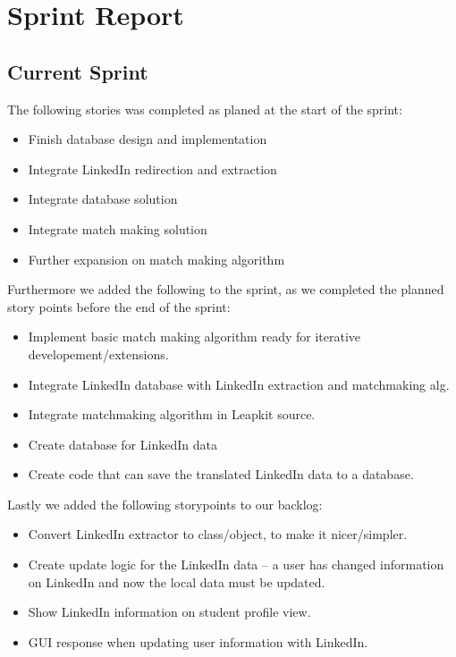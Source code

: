 \section{Sprint Report}

\subsection{Current Sprint}

The following stories was completed as planed at the start of the sprint:
\begin{itemize}
    \item Finish database design and implementation
    \item Integrate LinkedIn redirection and extraction
    \item Integrate database solution
    \item Integrate match making solution
    \item Further expansion on match making algorithm
\end{itemize}
Furthermore we added the following to the sprint, as we completed the planned story points before the end of the sprint:
\begin{itemize}
    \item Implement basic match making algorithm ready for iterative developement/extensions.
    \item Integrate LinkedIn database with LinkedIn extraction and matchmaking alg.
    \item Integrate matchmaking algorithm in Leapkit source.
    \item Create database for LinkedIn data
    \item Create code that can save the translated LinkedIn data to a database.
\end{itemize}
Lastly we added the following storypoints to our backlog:
\begin{itemize}
    \item Convert LinkedIn extractor to class/object, to make it nicer/simpler.
    \item Create update logic for the LinkedIn data -- a user has changed information on LinkedIn and now the local data must be updated.
    \item Show LinkedIn information on student profile view.
    \item GUI response when updating user information with LinkedIn.
\end{itemize}

